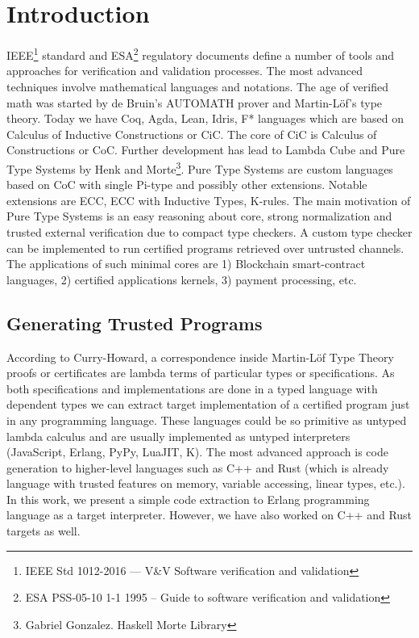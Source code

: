 \documentclass{aip-cp}
\begin{document}
\section{Introduction}
IEEE\footnote{IEEE Std 1012-2016  --- V\&V Software verification and validation} standard
and ESA\footnote{ESA PSS-05-10 1-1 1995 -- Guide to software verification and validation} regulatory documents define a number of tools and approaches for verification and validation processes. 
The most advanced techniques involve mathematical languages and notations. 
The age of verified math was started by de Bruin's AUTOMATH prover and Martin-Löf\cite{Lof84}'s type theory. 
Today we have Coq, Agda, Lean, Idris, F* languages which are based on Calculus of Inductive Constructions or CiC\cite{Mohring15}.
The core of CiC is Calculus of Constructions or CoC\cite{Coq88}.
Further development has lead to Lambda Cube\cite{Henk93} and Pure Type Systems by Henk\cite{Erik97} and Morte\footnote{Gabriel Gonzalez. Haskell Morte Library}.
Pure Type Systems are custom languages based on CoC with single Pi-type and possibly other extensions.
Notable extensions are ECC, ECC with Inductive Types\cite{Ore92}, K-rules\cite{Barthe95}.
The main motivation of Pure Type Systems is an easy reasoning about core, strong normalization and trusted external verification due to compact type checkers.
A custom type checker can be implemented to run certified programs retrieved over untrusted channels.
The applications of such minimal cores are 1) Blockchain smart-contract languages, 2) certified applications kernels, 3) payment processing, etc.

\subsection{Generating Trusted Programs}
According to Curry-Howard, a correspondence inside Martin-Löf Type Theory\cite{Lof84} proofs or certificates are lambda terms of particular types or specifications.
As both specifications and implementations are done in a typed language with dependent types we can extract target implementation of a certified program just in any programming language.
These languages could be so primitive as untyped lambda calculus and are usually implemented as untyped interpreters (JavaScript, Erlang, PyPy, LuaJIT, K).
The most advanced approach is code generation to higher-level languages such as C++ and Rust (which is already language with trusted features on memory, variable accessing, linear types, etc.).
In this work, we present a simple code extraction to Erlang programming language as a target interpreter.
However, we have also worked on C++ and Rust targets as well.
\end{document}
